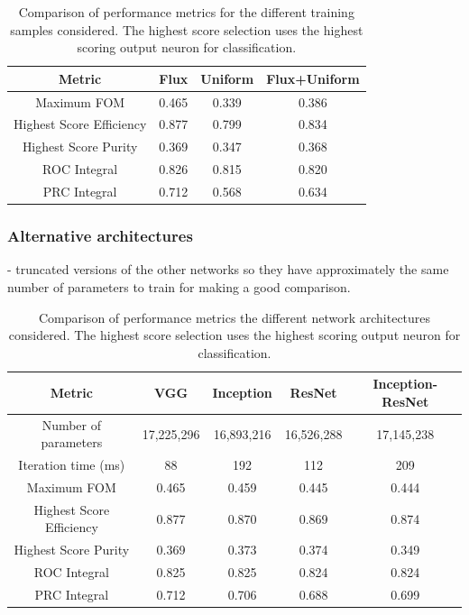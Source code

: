\begin{table}
    \begin{tabular}{cccc}
        Metric                   & Flux  & Uniform & Flux+Uniform \\
        \midrule
        Maximum FOM              & 0.465 & 0.339   & 0.386        \\
        Highest Score Efficiency & 0.877 & 0.799   & 0.834        \\
        Highest Score Purity     & 0.369 & 0.347   & 0.368        \\
        ROC Integral             & 0.826 & 0.815   & 0.820        \\
        PRC Integral             & 0.712 & 0.568   & 0.634        \\
    \end{tabular}
    \caption[Comparison of performance metrics for the different training samples considered.]
    {Comparison of performance metrics for the different training samples considered. The highest
        score selection uses the highest scoring output neuron for classification.}
    \label{tab:sample}
\end{table}

\subsubsection*{Alternative architectures} %

- truncated versions of the other networks so they have approximately the same number of
parameters to train for making a good comparison.

\begin{table}
    \begin{tabular}{ccccc}
        Metric                   & VGG        & Inception  & ResNet     & Inception-ResNet \\
        \midrule
        Number of parameters     & 17,225,296 & 16,893,216 & 16,526,288 & 17,145,238       \\
        Iteration time (ms)      & 88         & 192        & 112        & 209              \\
        Maximum FOM              & 0.465      & 0.459      & 0.445      & 0.444            \\
        Highest Score Efficiency & 0.877      & 0.870      & 0.869      & 0.874            \\
        Highest Score Purity     & 0.369      & 0.373      & 0.374      & 0.349            \\
        ROC Integral             & 0.825      & 0.825      & 0.824      & 0.824            \\
        PRC Integral             & 0.712      & 0.706      & 0.688      & 0.699            \\
    \end{tabular}
    \caption[Comparison of performance metrics for the different network architectures considered.]
    {Comparison of performance metrics the different network architectures considered. The highest
        score selection uses the highest scoring output neuron for classification.}
    \label{tab:arch}
\end{table}

